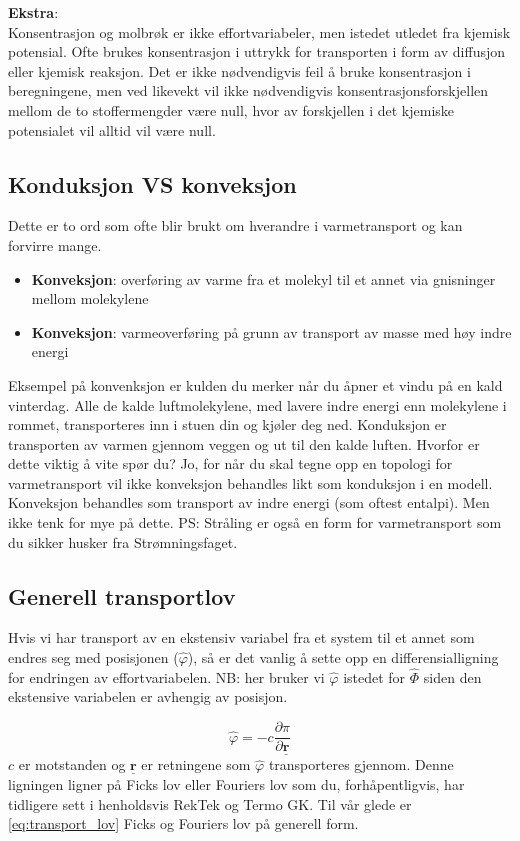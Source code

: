 \textbf{Ekstra}:\\ 
Konsentrasjon og molbrøk er ikke effortvariabeler, men istedet utledet fra kjemisk potensial. Ofte brukes konsentrasjon i uttrykk for transporten i form av diffusjon eller kjemisk reaksjon. Det er ikke nødvendigvis feil å bruke konsentrasjon i beregningene, men ved likevekt vil ikke nødvendigvis konsentrasjonsforskjellen mellom de to stoffermengder være null, hvor av forskjellen i det kjemiske potensialet vil alltid vil være null.  

\subsection{Konduksjon VS konveksjon}\label{sec:konveksjon_konduksjon}
Dette er to ord som ofte blir brukt om hverandre i varmetransport og kan forvirre mange. 

\begin{itemize}
    \item \textbf{Konveksjon}: overføring av varme fra et molekyl til et annet via gnisninger mellom molekylene
    \item \textbf{Konveksjon}: varmeoverføring på grunn av transport av masse med høy indre energi
\end{itemize}
Eksempel på konvenksjon er kulden du merker når du åpner et vindu på en kald vinterdag. Alle de kalde luftmolekylene, med lavere indre energi enn molekylene i rommet, transporteres inn i stuen din og kjøler deg ned. Konduksjon er transporten av varmen gjennom veggen og ut til den kalde luften. Hvorfor er dette viktig å vite spør du? Jo, for når du skal tegne opp en topologi for varmetransport vil ikke konveksjon behandles likt som konduksjon i en modell. Konveksjon behandles som transport av indre energi (som oftest entalpi). Men ikke tenk for mye på dette. PS: Stråling er også en form for varmetransport som du sikker husker fra Strømningsfaget. 

\subsection{Generell transportlov}
Hvis vi har transport av en ekstensiv variabel fra et system til et annet som endres seg med posisjonen ($\hat{\varphi}$), så er det vanlig å sette opp en differensialligning for endringen av effortvariabelen. NB: her bruker vi $\hat{\varphi}$ istedet for $\hat{\Phi}$ siden den ekstensive variabelen er avhengig av posisjon.

\begin{equation}
    \label{eq:transport_lov}
    \hat{\varphi} = -c\frac{\partial \pi}{\partial \underline{\textbf{r}}}
\end{equation}
$c$ er motstanden og $\underline{\textbf{r}}$ er retningene som $\hat{\varphi}$ transporteres gjennom. Denne ligningen ligner på Ficks lov eller Fouriers lov som du, forhåpentligvis, har tidligere sett i henholdsvis RekTek og Termo GK. Til vår glede er \cref{eq:transport_lov} Ficks og Fouriers lov på generell form. 

